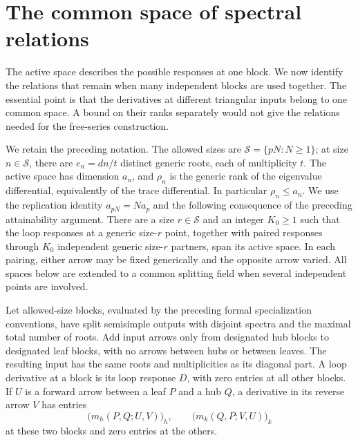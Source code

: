 \section{The common space of spectral relations}
\label{sec:global-defect}

The active space describes the possible responses at one block. We now
identify the relations that remain when many independent blocks are used
together. The essential point is that the derivatives at different
triangular inputs belong to one common space. A bound on their ranks
separately would not give the relations needed for the free-series
construction.

We retain the preceding notation. The allowed sizes are
\(\mathcal S=\{pN:N\geq1\}\); at size \(n\in\mathcal S\), there are
\(e_n=dn/t\) distinct generic roots, each of multiplicity \(t\).
The active space has dimension \(a_n\), and \(\rho_n\) is the generic
rank of the eigenvalue differential, equivalently of the trace
differential. In particular \(\rho_n\leq a_n\).
We use the replication identity \(a_{pN}=Na_p\) and the following
consequence of the preceding attainability argument. There are a size
\(r\in\mathcal S\) and an integer \(K_0\geq1\) such that the loop
responses at a generic size-\(r\) point, together with paired responses
through \(K_0\) independent generic size-\(r\) partners, span its
active space. In each pairing, either arrow may be fixed generically
and the opposite arrow varied. All spaces below are extended to a
common splitting field when several independent points are involved.

\begin{lemma}
\label{lem:star-derivatives}
Let allowed-size blocks, evaluated by the preceding formal
specialization conventions, have split semisimple outputs with
disjoint spectra and the maximal total number of roots. Add input
arrows only from designated
hub blocks to designated leaf blocks, with no arrows between hubs or
between leaves. The resulting input has the same roots and
multiplicities as its diagonal part. A loop derivative at a block is
its loop response \(D\), with zero entries at all other blocks. If
\(U\) is a forward arrow between a leaf \(P\) and a hub \(Q\), a
derivative in its reverse arrow \(V\) has entries
\[
 \bigl(m_h(P,Q;U,V)\bigr)_h,
 \qquad
 \bigl(m_k(Q,P;V,U)\bigr)_k
\]
at these two blocks and zero entries at the others.
\end{lemma}

